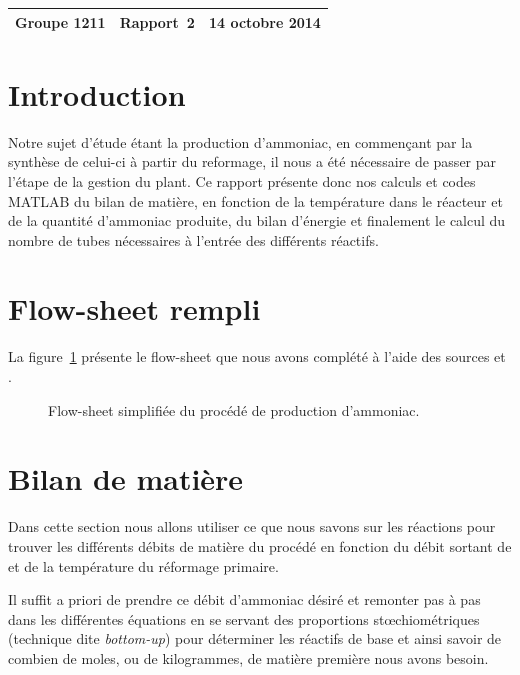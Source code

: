 \documentclass[a4paper,12pt]{article}
\begin{document}
\begin{center}
\begin{tabu} to \textwidth {lX[c]r}
    Groupe 1211 & \large{\textbf{Rapport~2}} & 14 octobre 2014 \\
    \hline
\end{tabu}
\end{center}

\section{Introduction}

Notre sujet d'étude étant la production d’ammoniac, en commençant par la synthèse de celui-ci à partir du reformage, il nous a été nécessaire de passer par l’étape de la gestion du plant. Ce rapport présente donc nos calculs et codes MATLAB du bilan de matière, en fonction de la température dans le réacteur et de la quantité d’ammoniac produite, du bilan d’énergie et finalement le calcul du nombre de tubes nécessaires à l’entrée des différents réactifs. 

\section{Flow-sheet rempli}

La figure~\ref{fig:flowsheet2} présente le flow-sheet que nous avons complété à l'aide des sources \cite{epa} et \cite{process-patent}.

\begin{figure}
    \centering
    
    \caption{Flow-sheet simplifiée du procédé de production d'ammoniac.}
    \label{fig:flowsheet2}
\end{figure}
%    

\section{Bilan de matière}

Dans cette section nous allons utiliser ce que nous savons
sur les réactions pour trouver les différents débits de matière du procédé
en fonction du débit sortant de 
et de la température du réformage primaire.

Il suffit a priori de prendre ce débit
d’ammoniac désiré et remonter pas à pas
dans les différentes équations en se servant des proportions stœchiométriques
(technique dite \emph{bottom-up})
pour déterminer les réactifs de base
et ainsi savoir de combien de moles, ou de kilogrammes, de matière première
nous avons besoin.
\end{document}
